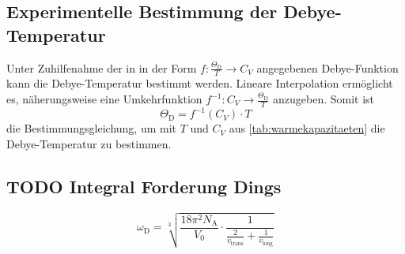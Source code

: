 \subsection{Experimentelle Bestimmung der Debye-Temperatur}
Unter Zuhilfenahme der in \cite[Tabelle 1]{versuchsanleitung}
in der Form $f: \frac{\Theta_\text{D}}{T} \longrightarrow C_V$
angegebenen Debye-Funktion
kann die Debye-Temperatur bestimmt werden.
Lineare Interpolation ermöglicht es, näherungsweise eine Umkehrfunktion
$f^{-1}: C_V \longrightarrow \frac{\Theta_\text{D}}{T}$
anzugeben.
Somit ist
\[
    \Theta_\text{D} = f^{-1}(C_V) · T
\]
die Bestimmungsgleichung, um mit $T$ und $C_V$ aus \autoref{tab:warmekapazitaeten} die Debye-Temperatur zu bestimmen.


\subsection{TODO Integral Forderung Dings}
\begin{equation*}
    \omega_\text{D}
    = \sqrt[3]{
        \frac{18 \pi^2 N_\text{A}}{V_0} · \frac{1}{\frac{2}{v_\text{trans}} + \frac{1}{v_\text{long}}}
    }
\end{equation*}
